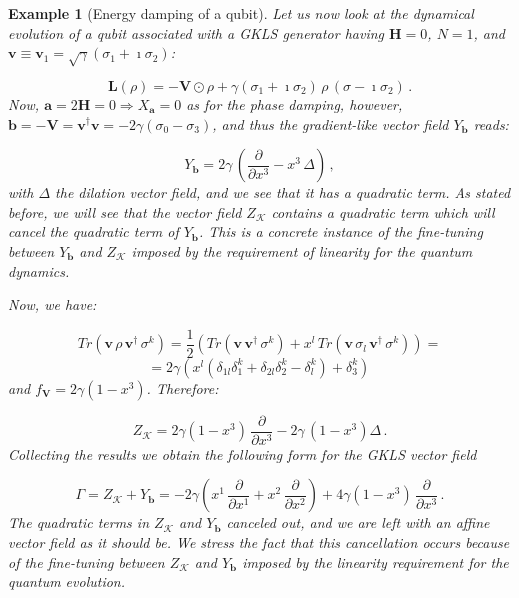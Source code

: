 \documentclass[11pt]{article}
\newcommand{\be}{\begin{equation}}
\newcommand{\ee}{\end{equation}}
\newtheorem{exmp}{Example}
\begin{document}
\begin{exmp}[Energy damping of a qubit]

Let us now look at the dynamical evolution of a qubit associated with a GKLS generator having $\mathbf{H}=0$, $N=1$, and $\mathbf{v}\equiv\mathbf{v}_{1}=\sqrt{\gamma}\left(\sigma_{1} + \imath\sigma_{2}\right)$:

\be
\mathbf{L}(\rho)=-\mathbf{V}\odot\rho + \gamma\left(\sigma_{1} + \imath\sigma_{2}\right)\,\rho\,\left(\sigma - \imath\sigma_{2}\right)\,.
\ee
Now, $\mathbf{a}=2\mathbf{H}=0\Rightarrow X_{\mathbf{a}}=0$ as for the phase damping, however, $\mathbf{b}=-\mathbf{V}=\mathbf{v}^{\dagger}\mathbf{v}=-2\gamma(\sigma_{0} - \sigma_{3})$, and thus the gradient-like vector field $Y_{\mathbf{b}}$ reads:

\be
Y_{\mathbf{b}}=  2\gamma\,\left(\frac{\partial}{\partial x^{3}} -  x^{3}\,\Delta\right)\,,
\ee
with $\Delta$ the dilation vector field, and we see that it has a quadratic term.
As stated before, we will see that the vector field $Z_{\mathcal{K}}$ contains a quadratic term which will cancel the quadratic term of $Y_{\mathbf{b}}$.
This is a concrete instance of the fine-tuning between $Y_{\mathbf{b}}$ and $Z_{\mathcal{K}}$ imposed by the requirement of linearity for the quantum dynamics.

Now, we have:

$$
Tr\left(\mathbf{v}\,\rho\,\mathbf{v}^{\dagger}\,\sigma^{k}\right)=\frac{1}{2}\left(Tr\left(\mathbf{v}\,\mathbf{v}^{\dagger}\,\sigma^{k}\right) + x^{l}\,Tr\left(\mathbf{v}\,\sigma_{l}\,\mathbf{v}^{\dagger}\,\sigma^{k}\right)\right)=
$$
\be
=2\gamma\left( x^{l}(\delta_{1l}\delta^{k}_{1} + \delta_{2l}\delta^{k}_{2} - \delta_{l}^{k}) + \delta^{k}_{3}\right)\,
\ee
and $f_{\mathbf{V}}=2\gamma\left(1 - x^{3}\right)$. 
Therefore:

\be
Z_{\mathcal{K}}=2\gamma\left(1- x^{3} \right)\,\frac{\partial}{\partial x^{3}} - 2\gamma\,\left(1 - x^{3}\right)\Delta \,.
\ee
Collecting the results we obtain the following form for the GKLS vector field

\be
\Gamma = Z_{\mathcal{K}} + Y_{\mathbf{b}}=-2\gamma\left(x^{1}\,\frac{\partial}{\partial x^{1}} + x^{2}\,\frac{\partial}{\partial x^{2}}\right) + 4\gamma\left(1 - x^{3}\right)\,\frac{\partial}{\partial x^{3}}\,.
\ee
The quadratic terms in $Z_{\mathcal{K}}$ and $Y_{\mathbf{b}}$ canceled out, and we are left with  an affine vector field as it should be.
We stress the fact that this cancellation occurs because of the fine-tuning between $Z_{\mathcal{K}}$ and $Y_{\mathbf{b}}$ imposed by the linearity requirement for the quantum evolution.


\end{exmp}
\end{document}
